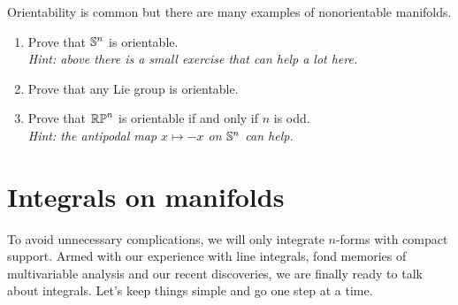 \begin{exercise}
  Orientability is common but there are many examples of nonorientable manifolds.
  \begin{enumerate}
    \item Prove that $\mathbb{S}^n$ is orientable.\\
      \textit{\small Hint: above there is a small exercise that can help a lot here.}
    \item Prove that any Lie group is orientable.
    \item Prove that $\mathbb{RP}^n$ is orientable if and only if $n$ is odd. \\
      \textit{\small Hint: the antipodal map $x\mapsto -x$ on $\mathbb{S}^n$ can help.}
  \end{enumerate}
\end{exercise}

\section{Integrals on manifolds}

To avoid unnecessary complications, we will only integrate $n$-forms with compact support.
Armed with our experience with line integrals, fond memories of multivariable analysis and our recent discoveries, we are finally ready to talk about integrals.
Let's keep things simple and go one step at a time.

